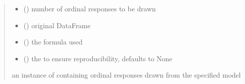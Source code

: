 \documentclass[letterpaper,10pt,english]{sphinxmanual}
\begin{document}
\begin{fulllineitems}
\begin{quote}
\begin{description}
\begin{itemize}
\item {} 
\sphinxAtStartPar
{} () \textendash{} number of ordinal responses to be drawn

\item {} 
\sphinxAtStartPar
{} () \textendash{} original DataFrame

\item {} 
\sphinxAtStartPar
{} () \textendash{} the formula used

\item {} 
\sphinxAtStartPar
{} (\sphinxstyleliteralemphasis{\sphinxupquote{, }}) \textendash{} the  to ensure reproducibility, defaults to None

\end{itemize}

\sphinxAtStartPar
an instance of  containing ordinal responses drawn from the specified model

\end{description}\end{quote}

\end{fulllineitems}

\end{document}
